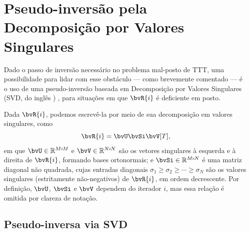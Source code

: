 \section{Pseudo-inversão pela Decomposição por Valores Singulares}
\label{sec:svd}
Dado o passo de inversão necessário no problema mal-posto de TTT, uma possibilidade para lidar com esse obstáculo --- como brevemente comentado --- é o uso de uma pseudo-inversão baseada em \gls{Decomposição por Valores Singulares} (SVD, do inglês ) \cite{berrar_practical_2003}, para situações em que $\bvR{i}$ é deficiente em posto.

Dada $\bvR{i}$, podemos escrevê-la por meio de sua decomposição em valores singulares, como
\begin{equation}
	\bvR{i} = \bvU \bvSi \bvV[T],
\end{equation}
em que $\bvU \in \re^{\sz{M}{M}}$ e $\bvV \in \re^{\sz{N}{N}}$ são os vetores singulares à esquerda e à direita de $\bvR{i}$, formando bases ortonormais; e $\bvSi \in \re^{\sz{M}{N}}$ é uma matriz diagonal não quadrada, cujas entradas diagonais $\sigma_1 \geq \sigma_2 \geq \cdots \geq \sigma_N$ são os valores singulares (estritamente não-negativos) de $\bvR{i}$, em ordem decrescente. Por definição, $\bvU$, $\bvSi$ e $\bvV$ dependem do iterador $i$, mas essa relação é omitida por clareza de notação.

\subsection{Pseudo-inversa via SVD}

